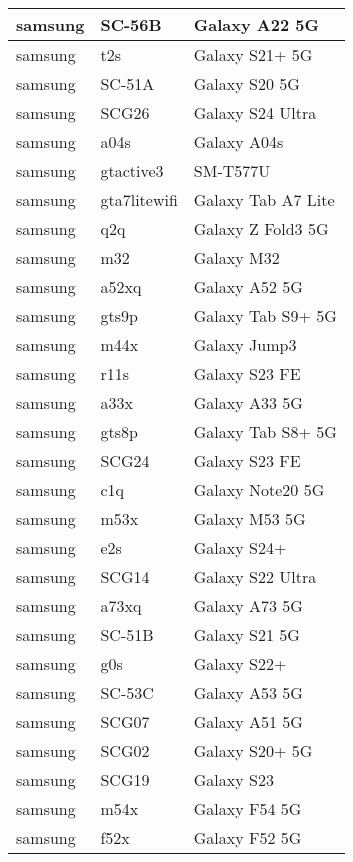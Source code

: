 \begin{tabularx}{\linewidth}{|l|X|X|}
        samsung & SC-56B & Galaxy A22 5G \\ \hline
        samsung & t2s & Galaxy S21+ 5G \\ \hline
        samsung & SC-51A & Galaxy S20 5G \\ \hline
        samsung & SCG26 & Galaxy S24 Ultra \\ \hline
        samsung & a04s & Galaxy A04s \\ \hline
        samsung & gtactive3 & SM-T577U \\ \hline
        samsung & gta7litewifi & Galaxy Tab A7 Lite \\ \hline
        samsung & q2q & Galaxy Z Fold3 5G \\ \hline
        samsung & m32 & Galaxy M32 \\ \hline
        samsung & a52xq & Galaxy A52 5G \\ \hline
        samsung & gts9p & Galaxy Tab S9+ 5G \\ \hline
        samsung & m44x & Galaxy Jump3 \\ \hline
        samsung & r11s & Galaxy S23 FE \\ \hline
        samsung & a33x & Galaxy A33 5G \\ \hline
        samsung & gts8p & Galaxy Tab S8+ 5G \\ \hline
        samsung & SCG24 & Galaxy S23 FE \\ \hline
        samsung & c1q & Galaxy Note20 5G \\ \hline
        samsung & m53x & Galaxy M53 5G \\ \hline
        samsung & e2s & Galaxy S24+ \\ \hline
        samsung & SCG14 & Galaxy S22 Ultra \\ \hline
        samsung & a73xq & Galaxy A73 5G \\ \hline
        samsung & SC-51B & Galaxy S21 5G \\ \hline
        samsung & g0s & Galaxy S22+ \\ \hline
        samsung & SC-53C & Galaxy A53 5G \\ \hline
        samsung & SCG07 & Galaxy A51 5G \\ \hline
        samsung & SCG02 & Galaxy S20+ 5G \\ \hline
        samsung & SCG19 & Galaxy S23 \\ \hline
        samsung & m54x & Galaxy F54 5G \\ \hline
        samsung & f52x & Galaxy F52 5G \\ \hline

\end{tabularx}
